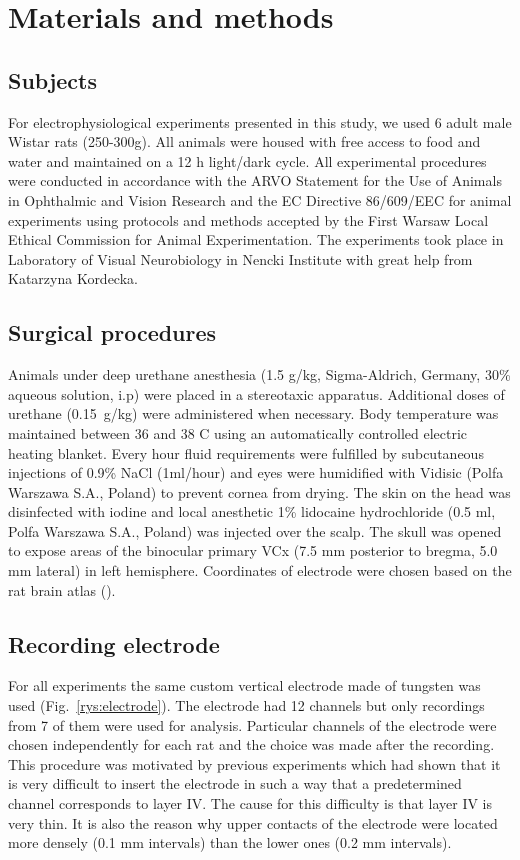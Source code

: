 \documentclass{pracalicmgr}
\begin{document}
   \chapter{Materials and methods}   
   \section{Subjects}
   For electrophysiological experiments presented in this study, we used 6 adult male Wistar rats (250-300g). All animals were housed with free access to food and water and maintained on a 12 h light/dark cycle. All experimental procedures  were conducted in accordance with the ARVO Statement for the Use of Animals in Ophthalmic and Vision Research and  the EC Directive 86/609/EEC for animal experiments using protocols and methods accepted by the First Warsaw Local Ethical Commission for Animal Experimentation. The experiments took place in Laboratory of Visual Neurobiology in Nencki Institute with great help from Katarzyna Kordecka.
   
   
   \section{Surgical procedures}
   Animals under deep urethane anesthesia (1.5 g/kg, Sigma-Aldrich, Germany, 30\% aqueous solution, i.p) were placed in a stereotaxic apparatus. Additional doses of urethane (0.15~g/kg) were administered when necessary. Body temperature was maintained between 36 and 38 \degree C using an automatically controlled electric heating blanket. Every hour fluid requirements were fulfilled by subcutaneous injections of 0.9\% NaCl (1ml/hour) and eyes were humidified with Vidisic (Polfa Warszawa S.A., Poland) to prevent cornea from drying. The skin on the head was disinfected with iodine and local anesthetic 1\% lidocaine hydrochloride (0.5 ml, Polfa Warszawa S.A., Poland) was injected over the scalp. The skull was opened to expose areas of the binocular primary VCx (7.5 mm posterior to bregma, 5.0 mm lateral) in left hemisphere. Coordinates of electrode were chosen based on the rat brain atlas (\cite{atlas}). 
   
   \section{Recording electrode}
   For all experiments the same custom vertical electrode made of tungsten was used (Fig.~\ref{rys:electrode}). The electrode had 12 channels but only recordings from 7 of them were used for analysis. Particular channels of the electrode were chosen independently for each rat and the choice was made after the recording. This procedure was motivated by previous experiments which had shown that it is very difficult to insert the electrode in such a way that a predetermined channel corresponds to layer IV. The cause for this difficulty is that layer IV is very thin. It is also the reason why upper contacts of the electrode were located more densely (0.1 mm intervals) than the lower ones (0.2 mm intervals).
   
\end{document}
